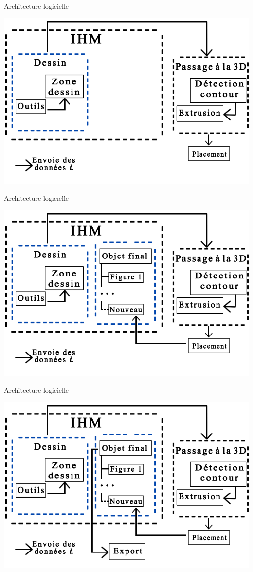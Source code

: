 \documentclass[a4paper,10pt]{beamer}
\begin{document}
	\begin{frame}{Architecture logicielle} %
		\centerline{\includegraphics[scale=0.3]{images/archilogi/archi4.png}}
	\end{frame}
	\begin{frame}{Architecture logicielle} %
		\centerline{\includegraphics[scale=0.3]{images/archilogi/archi5.png}}
	\end{frame}	
	\begin{frame}{Architecture logicielle} %
		\centerline{\includegraphics[scale=0.3]{images/archilogi/archi6.png}}
	\end{frame}	
			
\end{document}

